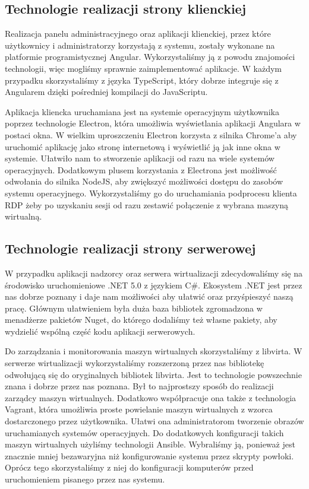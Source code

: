 \documentclass[../opis-rozwiazania.tex]{subfiles}
\begin{document}
\label{technologies}

\subsection{Technologie realizacji strony klienckiej}
Realizacja panelu administracyjnego oraz aplikacji klienckiej, przez które użytkownicy i administratorzy korzystają z systemu, zostały wykonane na platformie programistycznej Angular.
Wykorzystaliśmy ją z powodu znajomości technologii, więc mogliśmy sprawnie zaimplementować aplikacje.
W każdym przypadku skorzystaliśmy z języka TypeScript, który dobrze integruje się z Angularem dzięki pośredniej kompilacji do JavaScriptu.

Aplikacja kliencka uruchamiana jest na systemie operacyjnym użytkownika poprzez technologie Electron, która umożliwia wyświetlania aplikacji Angulara w postaci okna.
W wielkim uproszczeniu Electron korzysta z silnika Chrome'a aby uruchomić aplikację jako stronę internetową i wyświetlić ją jak inne okna w systemie.
Ułatwiło nam to stworzenie aplikacji od razu na wiele systemów operacyjnych.
Dodatkowym plusem korzystania z Electrona jest możliwość odwołania do silnika NodeJS, aby zwiększyć możliwości dostępu do zasobów systemu operacyjnego.
Wykorzystaliśmy go do uruchamiania podprocesu klienta RDP żeby po uzyskaniu sesji od razu zestawić połączenie z wybrana maszyną wirtualną.

\subsection{Technologie realizacji strony serwerowej}
W przypadku aplikacji nadzorcy oraz serwera wirtualizacji zdecydowaliśmy się na środowisko uruchomieniowe .NET 5.0 z językiem C\#.
Ekosystem .NET jest przez nas dobrze poznany i daje nam możliwości aby ułatwić oraz przyśpieszyć naszą pracę.
Głównym ułatwieniem była duża baza bibliotek zgromadzona w menadżerze pakietów Nuget, do którego dodaliśmy też własne pakiety, aby wydzielić wspólną część kodu aplikacji serwerowych.

Do zarządzania i monitorowania maszyn wirtualnych skorzystaliśmy z libvirta.
W serwerze wirtualizacji wykorzystaliśmy rozszerzoną przez nas bibliotekę odwołującą się do oryginalnych bibliotek libvirta.
Jest to technologie powszechnie znana i dobrze przez nas poznana. Był to najprostszy sposób do realizacji zarządcy maszyn wirtualnych.
Dodatkowo współpracuje ona także z technologia Vagrant, która umożliwia proste powielanie maszyn wirtualnych z wzorca dostarczonego przez użytkownika.
Ułatwi ona administratorom tworzenie obrazów uruchamianych systemów operacyjnych.
Do dodatkowych konfiguracji takich maszyn wirtualnych użyliśmy technologii Ansible.
Wybraliśmy ją, ponieważ jest znacznie mniej bezawaryjna niż konfigurowanie systemu przez skrypty powłoki.
Oprócz tego skorzystaliśmy z niej do konfiguracji komputerów przed uruchomieniem pisanego przez nas systemu.
\end{document}
